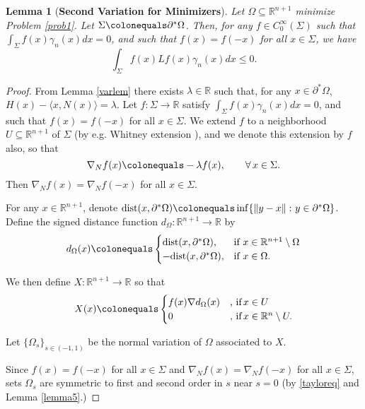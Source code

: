 \documentclass[12pt,reqno]{amsart}
\newtheorem{lemma}[theorem]{Lemma}
\theoremstyle{definition}
\renewcommand{\subset}{\subseteq}
\newcommand{\vnormt}[1]{\left\|#1\right\|}    %
\newcommand{\R}{\mathbb{R}}
\newcommand{\embolden}[1]{\textbf {#1}}
\newcommand{\redA}{\partial^{*}\Omega}
\newcommand{\sdimn}{n}
\newcommand{\adimn}{n+1}
\newcommand{\scon}{\lambda}
\begin{document}
\begin{lemma}[\embolden{Second Variation for Minimizers}]\label{varlem2}
Let $\Omega\subset\R^{\adimn}$ minimize Problem \ref{prob1}.  Let $\Sigma\colonequals\redA$.  Then, for any $f\in C_{0}^{\infty}(\Sigma)$ such that $\int_{\Sigma}f(x)\gamma_{\sdimn}(x)dx=0$, and such that $f(x)=f(-x)$ for all $x\in\Sigma$, we have
$$\int_{\Sigma}f(x)Lf(x)\gamma_{\sdimn}(x)dx\leq0.$$
\end{lemma}
\begin{proof}

From Lemma \ref{varlem} there exists $\scon\in\R$ such that, for any $x\in\redA$, $H(x)-\langle x,N(x)\rangle=\scon$.  Let $f\colon\Sigma\to\R$ satisfy $\int_{\Sigma}f(x)\gamma_{\sdimn}(x)dx=0$, and such that $f(x)=f(-x)$ for all $x\in\Sigma$.  We extend $f$ to a neighborhood $U\subset\R^{\adimn}$ of $\Sigma$ (by e.g. Whitney extension \cite{stein70}), and we denote this extension by $f$ also, so that
\begin{equation}\label{two9}
\nabla_{N}f(x)\colonequals-\scon f(x),\qquad\forall\,x\in\Sigma.
\end{equation}
Then $\nabla_{N}f(x)=\nabla_{N}f(-x)$ for all $x\in\Sigma$.

For any $x\in\R^{\adimn}$, denote $\mathrm{dist}(x,\redA)\colonequals\inf\{\vnormt{y-x}\colon y\in\redA\}$.  Define the signed distance function $d_{\Omega}\colon\R^{\adimn}\to\R$ by
$$
d_{\Omega}(x)
\colonequals
\begin{cases}
\mathrm{dist}(x,\redA), & \mbox{if}\,\, x\in\R^{\adimn}\setminus \Omega\\
-\mathrm{dist}(x,\redA), & \mbox{if}\,\, x\in \Omega.
\end{cases}
$$

We then define $X\colon\R^{\adimn}\to\R$ so that
\begin{equation}\label{nine4.67}
X(x)\colonequals
\begin{cases}
 f(x)\nabla d_{\Omega}(x) &\mbox{, if}\, x\in U\\
 0 & \mbox{, if}\,x\in\R^{n}\setminus U.
 \end{cases}
 \end{equation}

Let $\{\Omega_{s}\}_{s\in(-1,1)}$ be the normal variation of $\Omega$ associated to $X$.

Since $f(x)=f(-x)$ for all $x\in\Sigma$ and $\nabla_{N}f(x)=\nabla_{N}f(-x)$ for all $x\in\Sigma$, sets $\Omega_{s}$ are symmetric to first and second order in $s$ near $s=0$ (by \eqref{tayloreq} and Lemma \ref{lemma5}.)


\end{proof}
\end{document}
